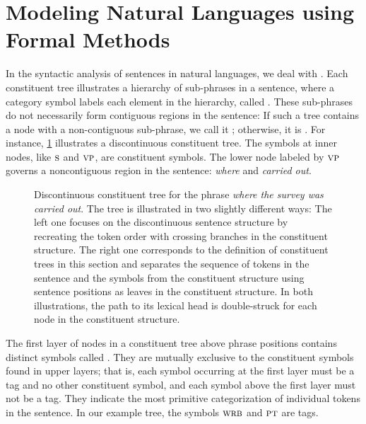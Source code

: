 \documentclass[../document.tex]{subfiles}
\begin{document}
    \section{Modeling Natural Languages using Formal Methods}\label{sec:preliminaries:ctrees}
    In the syntactic analysis of sentences in natural languages, we deal with .
    Each constituent tree illustrates a hierarchy of sub-phrases in a sentence, where a category symbol labels each element in the hierarchy, called .
    These sub-phrases do not necessarily form contiguous regions in the sentence:
    If such a tree contains a node with a non-contiguous sub-phrase, we call it ; otherwise, it is .
    For instance, \cref{fig:pre:ctree} illustrates a discontinuous constituent tree.
    The symbols at inner nodes, like \(\textsc{s}\) and \(\textsc{vp}\), are constituent symbols.
    The lower node labeled by \(\textsc{vp}\) governs a noncontiguous region in the sentence: \emph{where} and \emph{carried out}.

    \begin{figure}
        \null\hfill
        
        \hfill\null

        \caption{\label{fig:pre:ctree}
            Discontinuous constituent tree for the phrase \emph{where the survey was carried out}.
            The tree is illustrated in two slightly different ways:
                The left one focuses on the discontinuous sentence structure by recreating the token order with crossing branches in the constituent structure.
                The right one corresponds to the definition of constituent trees in this section and separates the sequence of tokens in the sentence and the  symbols from the constituent structure using sentence positions as leaves in the constituent structure.
            In both illustrations, the path to its lexical head is double-struck for each node in the constituent structure.
        }
    \end{figure}

    The first layer of nodes in a constituent tree above phrase positions contains distinct symbols called  .
    They are mutually exclusive to the constituent symbols found in upper layers; that is, each symbol occurring at the first layer must be a  tag and no other constituent symbol, and each symbol above the first layer must not be a  tag.
    They indicate the most primitive categorization of individual tokens in the sentence.
    In our example tree, the symbols \(\textsc{wrb}\) and \(\textsc{pt}\) are  tags.
\end{document}
